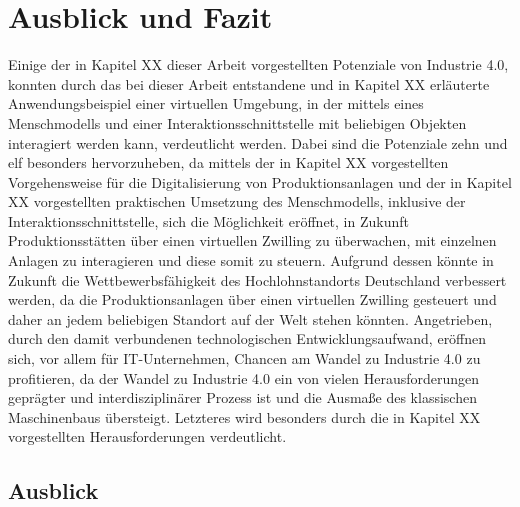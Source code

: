 \chapter{Ausblick und Fazit}\label{cha:AusblickUndFazit}

Einige der in Kapitel XX dieser Arbeit vorgestellten Potenziale von Industrie 4.0, konnten durch das bei dieser Arbeit entstandene und in Kapitel XX erläuterte Anwendungsbeispiel einer virtuellen Umgebung, in der mittels eines Menschmodells und einer Interaktionsschnittstelle mit beliebigen Objekten interagiert werden kann, verdeutlicht werden.
\newline
Dabei sind die Potenziale zehn und elf besonders hervorzuheben, da mittels der in Kapitel XX vorgestellten Vorgehensweise für die Digitalisierung von Produktionsanlagen und der in Kapitel XX vorgestellten praktischen Umsetzung des Menschmodells, inklusive der Interaktionsschnittstelle, sich die Möglichkeit eröffnet, in Zukunft Produktionsstätten über einen virtuellen Zwilling zu überwachen, mit einzelnen Anlagen zu interagieren und diese somit zu steuern. Aufgrund dessen könnte in Zukunft die Wettbewerbsfähigkeit des Hochlohnstandorts Deutschland verbessert werden, da die Produktionsanlagen über einen virtuellen Zwilling gesteuert und daher an jedem beliebigen Standort auf der Welt stehen könnten.
\newline
Angetrieben, durch den damit verbundenen technologischen Entwicklungsaufwand, eröffnen sich, vor allem für IT-Unternehmen, Chancen am Wandel zu Industrie 4.0 zu profitieren, da der Wandel zu Industrie 4.0 ein von vielen Herausforderungen geprägter und interdisziplinärer Prozess ist und die Ausmaße des klassischen Maschinenbaus übersteigt. Letzteres wird besonders durch die in Kapitel XX vorgestellten Herausforderungen verdeutlicht.

\section{Ausblick}\label{sec:Ausblick}

